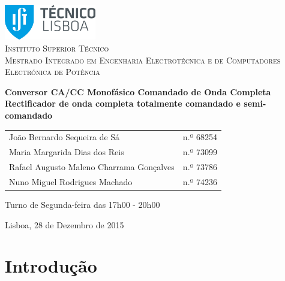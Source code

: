 \documentclass[a4paper,11pt]{article}
\numberwithin{equation}{section}
\begin{document}
\begin{titlepage}
\begin{center}

\hfill \break
\hfill \break

\includegraphics[width=0.3\textwidth]{img/logo}~\\[1cm] 

\textsc{\LARGE Instituto Superior Técnico}\\[0.25cm]
\textsc{\Large Mestrado Integrado em Engenharia Electrotécnica e de Computadores}\\[1.8cm]
\textsc{\huge Electrónica de Potência}\\[0.25cm]

\vspace{6mm}

{\huge \bfseries Conversor CA/CC Monofásico \linebreak Comandado de Onda Completa \\[0.7cm]}
{\bfseries Rectificador de onda completa totalmente comandado e semi-comandado \\[1cm]}

\begin{tabular}{ l l }
	João Bernardo Sequeira de Sá & \hspace{2mm} n.º 68254 \\
	Maria Margarida Dias dos Reis & \hspace{2mm} n.º 73099 \\
	Rafael Augusto Maleno Charrama Gonçalves & \hspace{2mm} n.º 73786 \\
	Nuno Miguel Rodrigues Machado & \hspace{2mm} n.º 74236
\end{tabular}

\vspace{7mm}

Turno de Segunda-feira das 17h00 - 20h00

\vfill

{\large Lisboa, 28 de Dezembro de 2015} 
	
\end{center}
\end{titlepage}
	
\tableofcontents
\pagebreak

\section{Introdução}
\end{document}
